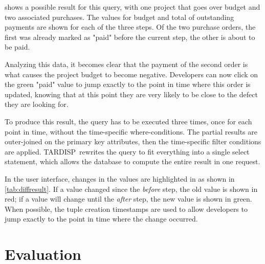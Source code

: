 \documentclass[english,conference,final]{IEEEtran}
\newcommand{\tool}{TAR\-DISP}
\begin{document}
 shows a possible result for this query, with one project that goes over budget and two associated purchases.
The values for budget and total of outstanding payments are shown for each of the three steps.
Of the two purchase orders, the first was already marked as "paid" before the current step, the other is about to be paid.

Analyzing this data, it becomes clear that the payment of the second order is what causes the project budget to become negative.
Developers can now click on the green "paid" value to jump exactly to the point in time where this order is updated, knowing that at this point they are very likely to be close to the defect they are looking for.

To produce this result, the query has to be executed three times, once for each point in time, without the time-specific where-conditions.
The partial results are outer-joined on the primary key attributes, then the time-specific filter conditions are applied.
\tool\ rewrites the query to fit everything into a single select statement, which allows the database to compute the entire result in one request.

In the user interface, changes in the values are highlighted in as shown in \cref{tab:diffresult}.
If a value changed since the \emph{before} step, the old value is shown in red; if a value will change until the \emph{after} step, the new value is shown in green.
When possible, the tuple creation timestamps are used to allow developers to jump exactly to the point in time where the change occurred.


\section{Evaluation}
\label{sec:evaluation}

\end{document}

